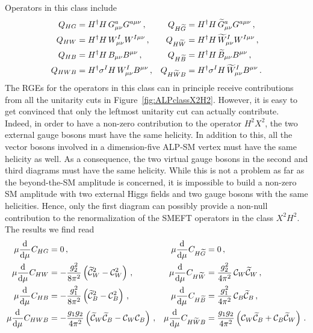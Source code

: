 Operators in this class include
\begin{align}
Q_{HG} &= H^\dagger H \, G_{\mu\nu}^a G^{a\mu\nu}\,, & Q_{H\widetilde{G}}&= H^\dagger H\,\widetilde{G}_{\mu\nu}^aG^{a\mu\nu}\,, \\
Q_{HW} &= H^\dagger H \, W_{\mu\nu}^I W^{I\mu\nu}\,, &Q_{H\widetilde{W}}&= H^\dagger H\,\widetilde{W}_{\mu\nu}^I W^{I\mu\nu}\,,  \\
Q_{HB} &= H^\dagger H \, B_{\mu\nu}B^{\mu\nu}\,, &Q_{H\widetilde{B}}&= H^\dagger H\,\widetilde{B}_{\mu\nu}B^{\mu\nu} \,,\\
Q_{HWB} &= H^\dagger \sigma^I H \, W_{\mu\nu}^I B^{\mu\nu}\,, & Q_{H\widetilde{W} B}&= H^\dagger\sigma^I  H\,\widetilde{W}_{\mu\nu}^I B^{\mu\nu} \,.
\end{align}
The RGEs for the operators in this class can in principle receive contributions from all the
unitarity cuts in Figure~\ref{fig:ALPclassX2H2}.
However, it is easy to get convinced that only the leftmost unitarity cut can actually
contribute.
Indeed, in order to have a non-zero contribution to the operator $H^2 X^2$, the two external
gauge bosons must have the same helicity.
In addition to this, all the vector bosons involved in a dimension-five ALP-SM vertex must have
the same helicity as well.
As a consequence, the two virtual gauge bosons in the second and third diagrams must have the
same helicity.
While this is not a problem as far as the beyond-the-SM amplitude is concerned, it is
impossible to build a non-zero SM amplitude with two external Higgs fields and two gauge bosons
with the same helicities.
Hence, only the first diagram can possibly provide a non-null contribution to the
renormalization of the SMEFT operators in the class $X^2 H^2$. The results we find read
\begin{align}
\mu \dv[]{}{\mu} {C}_{HG} &= 0\,, & \mu \dv[]{}{\mu} {C}_{H\widetilde{G}} &= 0\,,  \\
\mu \dv[]{}{\mu} {C}_{HW} &= -\frac{g_2^2}{8\pi^2}  \left(\widetilde{\mathcal{C}}_{W}^2 - \mathcal{C}^2_{W} \right)\,, & \mu \dv[]{}{\mu} {C}_{H\widetilde{W}} &=  \frac{g_2^2}{4\pi^2}\,\mathcal{C}_{W} \widetilde{\mathcal{C}}_{W}\,,  \\
\mu \dv[]{}{\mu} {C}_{HB} &= -\frac{g_1^2}{8\pi^2}  \left(\widetilde{\mathcal{C}}_{B}^2 - \mathcal{C}^2_{B} \right)\,, & \mu \dv[]{}{\mu} {C}_{H\widetilde{B}} &= \frac{g_1^2}{4\pi^2} \, \mathcal{C}_{B} \widetilde{\mathcal{C}}_{B}\,,    \\
\mu \dv[]{}{\mu} {C}_{HWB} &= -\frac{g_1 g_2}{4\pi^2}  \left(\widetilde{\mathcal{C}}_{W}\widetilde{\mathcal{C}}_{B} - \mathcal{C}_{W}\mathcal{C}_{B} \right)\,,
 &
 \mu \dv[]{}{\mu} {C}_{H\widetilde{W}B} &= \frac{g_1 g_2}{4\pi^2}\left(\mathcal{C}_{W} \widetilde{\mathcal{C}}_{B}+ \mathcal{C}_{B} \widetilde{\mathcal{C}}_{W}\right)\,.
\end{align}

